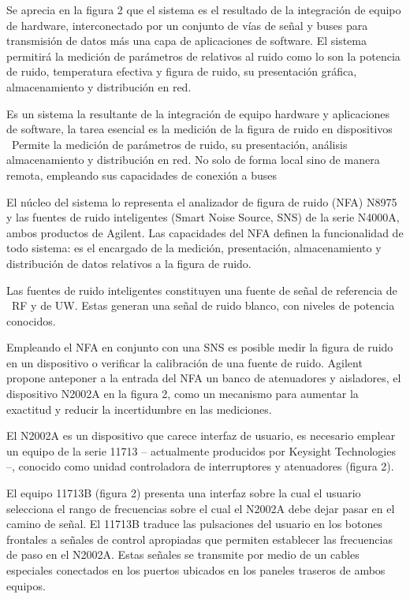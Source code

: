 \documentclass[paper=letter,oneside,fontsize=10pt,parskip=full]{article}
\begin{document}
Se aprecia en la figura 2 que el sistema es el resultado de la integración de equipo de hardware, interconectado por un
conjunto de vías de señal y buses para transmisión de datos más una capa de aplicaciones de software. El sistema
permitirá la medición de parámetros de relativos al ruido como lo son la potencia de ruido, temperatura efectiva y
figura de ruido, su presentación gráfica, almacenamiento y distribución en red.

Es un sistema la resultante de la integración de equipo hardware y aplicaciones de software, la tarea esencial es la
medición de la figura de ruido en dispositivos \ Permite la medición de parámetros de ruido, su presentación, análisis
almacenamiento y distribución en red. No solo de forma local sino de manera remota, empleando sus capacidades de
conexión a buses

El núcleo del sistema lo representa el analizador de figura de ruido (NFA) N8975 y las fuentes de ruido inteligentes
(Smart Noise Source, SNS) de la serie N4000A, ambos productos de Agilent. Las capacidades del NFA definen la
funcionalidad de todo sistema: es el encargado de la medición, presentación, almacenamiento y distribución de datos
relativos a la figura de ruido. 

Las fuentes de ruido inteligentes constituyen una fuente de señal de referencia de \ RF y de UW. Estas generan una señal
de ruido blanco, con niveles de potencia conocidos. 

Empleando el NFA en conjunto con una SNS es posible medir la figura de ruido en un dispositivo o verificar la
calibración de una fuente de ruido. Agilent propone anteponer a la entrada del NFA un banco de atenuadores y
aisladores, el dispositivo N2002A en la figura 2, como un mecanismo para aumentar la exactitud y reducir la
incertidumbre en las mediciones.

El N2002A es un dispositivo que carece interfaz de usuario, es necesario emplear un equipo de la serie 11713 –
actualmente producidos por Keysight Technologies –, conocido como unidad controladora de interruptores y atenuadores
(figura 2). 

El equipo 11713B (figura 2) presenta una interfaz sobre la cual el usuario selecciona el rango de frecuencias sobre el
cual el N2002A debe dejar pasar en el camino de señal. El 11713B traduce las pulsaciones del usuario en los botones
frontales a señales de control apropiadas que permiten establecer las frecuencias de paso en el N2002A. Estas señales
se transmite por medio de un cables especiales conectados en los puertos ubicados en los paneles traseros de ambos
equipos.
\end{document}
